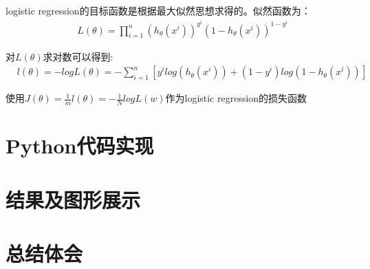 \documentclass[lang=cn,12pt,a4paper,cite=authoryear]{elegantpaper}
\begin{document}
logistic regression的目标函数是根据最大似然思想求得的。似然函数为：
\begin{equation}
	\begin{aligned}
		&L(\theta)=\prod_{i=1}^{n}(h_{\theta}(x^{i}))^{y^{i}}(1-h_{\theta}(x^{i}))^{1-y^{i}}
	\end{aligned}
\end{equation}


对$L(\theta)$求对数可以得到:
\begin{equation}
	\begin{aligned}
		&l(\theta)=-logL(\theta)=-\sum_{i=1}^{n}[{y^{i}}log(h_{\theta}(x^{i}))+(1-y^{i})log(1-h_{\theta}(x^{i}))]
	\end{aligned}
\end{equation}

使用$J(\theta)=\frac{1}{m}l(\theta)=-\frac{1}{N}logL(w) $作为logistic regression的损失函数



\subsection{}

\section{Python代码实现}

\section{结果及图形展示}

\section{总结体会}
\end{document}
